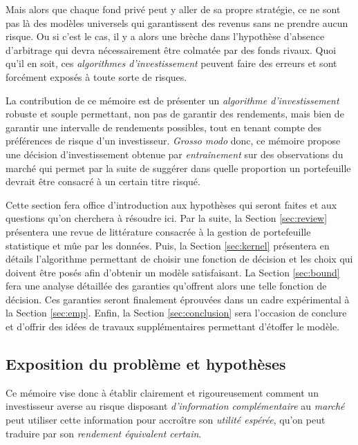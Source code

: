 Mais alors que chaque fond privé peut y aller de sa propre stratégie, ce ne sont pas là
des modèles universels qui garantissent des revenus sans ne prendre aucun risque. Ou si
c'est le cas, il y a alors une brèche dans l'hypothèse d'absence d'arbitrage qui devra
nécessairement être colmatée par des fonds rivaux. Quoi qu'il en soit, ces
\textit{algorithmes d'investissement} peuvent faire des erreurs et sont forcément exposés
à toute sorte de risques.

La contribution de ce mémoire est de présenter un \textit{algorithme d'investissement}
robuste et souple permettant, non pas de garantir des rendements, mais bien de garantir
une intervalle de rendements possibles, tout en tenant compte des préférences de risque
d'un investisseur. \textit{Grosso modo} donc, ce mémoire propose une décision
d'investissement obtenue par \textit{entraînement} sur des observations du marché qui
permet par la suite de suggérer dans quelle proportion un portefeuille devrait être
consacré à un certain titre risqué.

Cette section fera office d'introduction aux hypothèses qui seront faites et aux questions
qu'on cherchera à résoudre ici. Par la suite, la Section \ref{sec:review} présentera une
revue de littérature consacrée à la gestion de portefeuille statistique et mûe par les
données. Puis, la Section \ref{sec:kernel} présentera en détails l'algorithme permettant
de choisir une fonction de décision et les choix qui doivent être posés afin d'obtenir un
modèle satisfaisant. La Section \ref{sec:bound} fera une analyse détaillée des garanties
qu'offrent alors une telle fonction de décision. Ces garanties seront finalement éprouvées
dans un cadre expérimental à la Section \ref{sec:emp}. Enfin, la Section
\ref{sec:conclusion} sera l'occasion de conclure et d'offrir des idées de travaux
supplémentaires permettant d'étoffer le modèle.



\subsection{Exposition du problème et hypothèses}

Ce mémoire vise donc à établir clairement et rigoureusement comment un investisseur averse
au risque disposant \textit{d'information complémentaire} au \textit{marché} peut utiliser
cette information pour accroître son \textit{utilité espérée}, qu'on peut traduire par son
\textit{rendement équivalent certain}.

